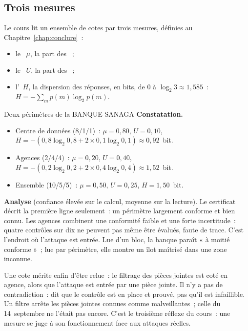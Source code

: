 \subsection{Trois mesures}

Le cours lit un ensemble de cotes par trois mesures, définies au
Chapitre~\ref{chap:conclure}~:
\begin{itemize}
    \item le ~$\mu$, la
          part des \OUI{}~;
    \item le ~$U$, la
          part des \NEK{}~;
    \item l'~$H$, la dispersion des
          réponses, en bits, de 0 à $\log_2 3 \approx 1{,}585$~:
          $H = -\sum_m p(m)\log_2 p(m)$.
\end{itemize}

\begin{boxlecture}{Deux périmètres de la BANQUE SANAGA}
\textbf{Constatation.}
\begin{itemize}
    \item Centre de données (8/1/1)~: $\mu = 0{,}80$, $U = 0{,}10$,
          $H = -(0{,}8\log_2 0{,}8 + 2 \times 0{,}1\log_2 0{,}1) \approx 0{,}92$~bit.
    \item Agences (2/4/4)~: $\mu = 0{,}20$, $U = 0{,}40$,
          $H = -(0{,}2\log_2 0{,}2 + 2 \times 0{,}4\log_2 0{,}4) \approx 1{,}52$~bit.
    \item Ensemble (10/5/5)~: $\mu = 0{,}50$, $U = 0{,}25$, $H = 1{,}50$~bit.
\end{itemize}

\textbf{Analyse} (confiance élevée sur le calcul, moyenne sur la lecture).
Le certificat décrit la première ligne seulement~: un périmètre largement
conforme et bien connu. Les agences combinent une conformité faible et une
forte incertitude~: quatre contrôles sur dix ne peuvent pas même être
évalués, faute de trace. C'est l'endroit où l'attaque est entrée. Lue
d'un bloc, la banque paraît « à moitié conforme »~; lue par périmètre, elle
montre un îlot maîtrisé dans une zone inconnue.

\medskip
Une cote mérite enfin d'être relue~: le filtrage des pièces jointes est
coté \OUI{} en agence, alors que l'attaque est entrée par une pièce jointe.
Il n'y a pas de contradiction~: \OUI{} dit que le contrôle est en place et
prouvé, pas qu'il est infaillible. Un filtre arrête les pièces jointes
connues comme malveillantes~; celle du 14~septembre ne l'était pas encore.
C'est le troisième réflexe du cours~: une mesure se juge à son
fonctionnement face aux attaques réelles.

\medskip
\hfill{}
\end{boxlecture}

